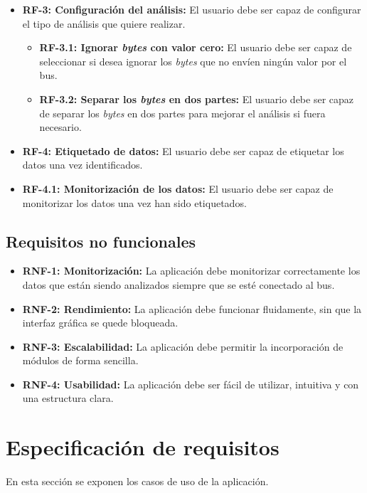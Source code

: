\begin{itemize}
\item
\textbf{RF-3: Configuración del análisis:} El usuario debe ser capaz de configurar el tipo de análisis que quiere realizar.
\begin{itemize}
\item
\textbf{RF-3.1: Ignorar \emph{bytes} con valor cero:} El usuario debe ser capaz de seleccionar si desea ignorar los \emph{bytes} que no envíen ningún valor por el bus.
\item
\textbf{RF-3.2: Separar los \emph{bytes} en dos partes:} El usuario debe ser capaz de separar los \emph{bytes} en dos partes para mejorar el análisis si fuera necesario.
\end{itemize}
\item
\textbf{RF-4: Etiquetado de datos:} El usuario debe ser capaz de etiquetar los datos una vez identificados.
\item
\begin{itemize}
\textbf{RF-4.1: Monitorización de los datos:} El usuario debe ser capaz de monitorizar los datos una vez han sido etiquetados.
\end{itemize}
\end{itemize}


\subsection{Requisitos no funcionales}

\begin{itemize}
\item
\textbf{RNF-1: Monitorización:} La aplicación debe monitorizar correctamente los datos que están siendo analizados siempre que se esté conectado al bus.
\item
\textbf{RNF-2: Rendimiento:} La aplicación debe funcionar fluidamente, sin que la interfaz gráfica se quede bloqueada.
\item
\textbf{RNF-3: Escalabilidad:} La aplicación debe permitir la incorporación de módulos de forma sencilla.
\item
\textbf{RNF-4: Usabilidad:} La aplicación debe ser fácil de utilizar, intuitiva y con una estructura clara.
\end{itemize}
\newpage
\section{Especificación de requisitos}

En esta sección se exponen los casos de uso de la aplicación.

